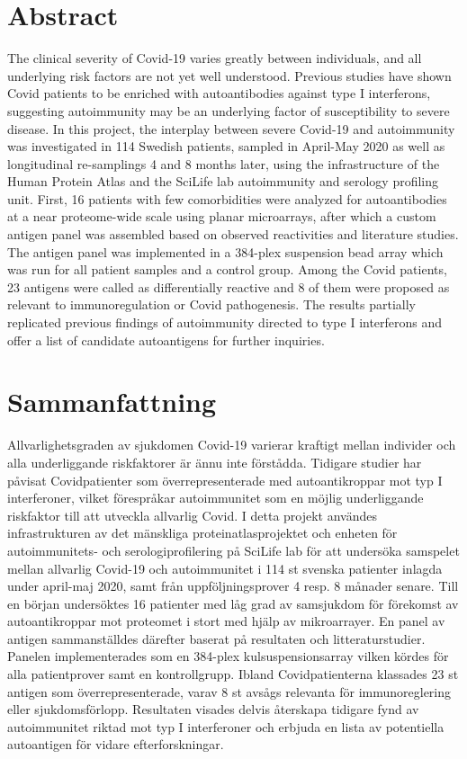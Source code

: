 \documentclass{article}
\begin{document}


\newpage
\setcounter{page}{1}
\thispagestyle{empty}
\section*{Abstract}
The clinical severity of Covid-19 varies greatly between individuals, and all underlying risk factors are not yet well understood. Previous studies have shown Covid patients to be enriched with autoantibodies against type I interferons, suggesting autoimmunity may be an underlying factor of susceptibility to severe disease. In this project, the interplay between severe Covid-19 and autoimmunity was investigated in 114 Swedish patients, sampled in April-May 2020 as well as longitudinal re-samplings 4 and 8 months later, using the infrastructure of the Human Protein Atlas and the SciLife lab autoimmunity and serology profiling unit. First, 16 patients with few comorbidities were analyzed for autoantibodies at a near proteome-wide scale using planar microarrays, after which a custom antigen panel was assembled based on observed reactivities and literature studies. The antigen panel was implemented in a 384-plex suspension bead array which was run for all patient samples and a control group. Among the Covid patients, 23 antigens were called as differentially reactive and 8 of them were proposed as relevant to immunoregulation or Covid pathogenesis. The results partially replicated previous findings of autoimmunity directed to type I interferons and offer a list of candidate autoantigens for further inquiries.

\vspace{1cm}
\section*{Sammanfattning}
Allvarlighetsgraden av sjukdomen Covid-19 varierar kraftigt mellan individer och alla underliggande riskfaktorer är ännu inte förstådda. Tidigare studier har påvisat Covidpatienter som överrepresenterade med autoantikroppar mot typ I interferoner, vilket förespråkar autoimmunitet som en möjlig underliggande riskfaktor till att utveckla allvarlig Covid. I detta projekt användes infrastrukturen av det mänskliga proteinatlasprojektet och enheten för autoimmunitets- och serologiprofilering på SciLife lab för att undersöka samspelet mellan allvarlig Covid-19 och autoimmunitet i 114 st svenska patienter inlagda under april-maj 2020, samt från uppföljningsprover 4 resp. 8 månader senare. Till en början undersöktes 16 patienter med låg grad av samsjukdom för förekomst av autoantikroppar mot proteomet i stort med hjälp av mikroarrayer. En panel av antigen sammanställdes därefter baserat på resultaten och litteraturstudier. Panelen implementerades som en 384-plex kulsuspensionsarray vilken kördes för alla patientprover samt en kontrollgrupp. Ibland Covidpatienterna klassades 23 st antigen som överrepresenterade, varav 8 st avsågs relevanta för immunoreglering eller sjukdomsförlopp. Resultaten visades delvis återskapa tidigare fynd av autoimmunitet riktad mot typ I interferoner och erbjuda en lista av potentiella autoantigen för vidare efterforskningar.
\end{document}
